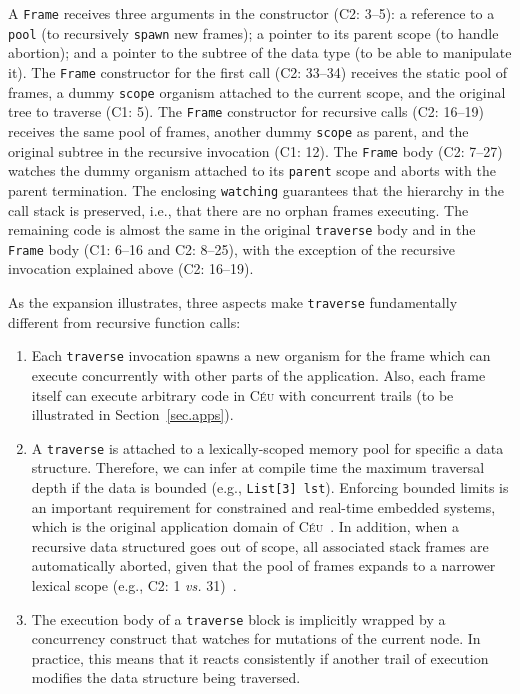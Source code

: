 \documentclass{sig-alternate}
\newcommand{\CEU}{\textsc{C\'{e}u}\xspace}
\newcommand{\code}[1] {{\small{\texttt{#1}}}}
\newcommand{\MM}[1] {\textcircled{\tiny{\textsf{#1}}}}
\begin{document}
A \code{Frame} receives three arguments in the constructor (\MM{C2}: 3--5):
a reference to a \code{pool} (to recursively \code{spawn} new frames);
a pointer to its parent scope (to handle abortion);
and a pointer to the subtree of the data type (to be able to manipulate it).
%
The \code{Frame} constructor for the first call (\MM{C2}: 33--34) receives the 
static pool of frames, a dummy \code{scope} organism attached to the current 
scope, and the original tree to traverse (\MM{C1}: 5).
%
The \code{Frame} constructor for recursive calls (\MM{C2}: 16--19) receives the 
same pool of frames, another dummy \code{scope} as parent, and the original 
subtree in the recursive invocation (\MM{C1}: 12).
%
The \code{Frame} body (\MM{C2}: 7--27) watches the dummy organism attached to 
its \code{parent} scope and aborts with the parent termination.
The enclosing \code{watching} guarantees that the hierarchy in the call stack 
is preserved, i.e., that there are no orphan frames executing.
%
The remaining code is almost the same in the original \code{traverse} body and 
in the \code{Frame} body (\MM{C1}: 6--16 and \MM{C2}: 8--25), with the 
exception of the recursive invocation explained above (\MM{C2}: 16--19).

As the expansion illustrates, three aspects make \code{traverse} fundamentally 
different from recursive function calls:
%
\begin{enumerate}
\item Each \code{traverse} invocation spawns a new organism for the frame which 
can execute concurrently with other parts of the application.
Also, each frame itself can execute arbitrary code in \CEU with concurrent 
trails (to be illustrated in Section~\ref{sec.apps}).
%
\item A \code{traverse} is attached to a lexically-scoped memory pool for 
specific a data structure.
Therefore, we can infer at compile time the maximum traversal depth if the data 
is bounded (e.g., \code{List[3] lst}).
Enforcing bounded limits is an important requirement for constrained and 
real-time embedded systems, which is the original application domain of 
\CEU~\cite{ceu.sensys13}.
In addition, when a recursive data structured goes out of scope, all associated 
stack frames are automatically aborted, given that the pool of frames expands 
to a narrower lexical scope (e.g., \MM{C2}: 1 \emph{vs.} 31)~\cite{ceu.mod15}.
%
\item The execution body of a \code{traverse} block is implicitly wrapped by a 
concurrency construct that watches for mutations of the current node.
In practice, this means that it reacts consistently if another trail of 
execution modifies the data structure being traversed.
\end{enumerate}
\end{document}
